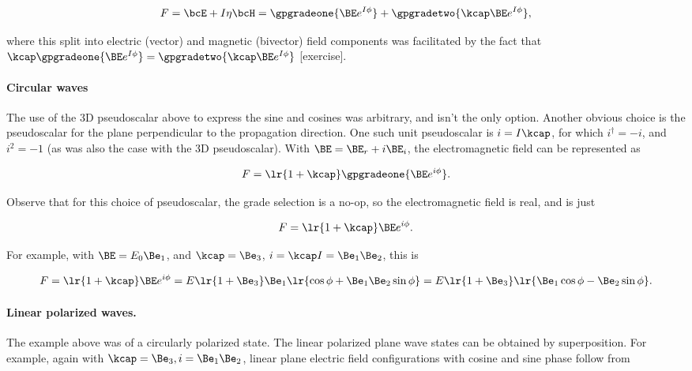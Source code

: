 \begin{equation}\label{eqn:ellipticalWaves:220}
F = \bcE + I \eta \bcH
=
\gpgradeone{ \BE e^{I \phi } } +
\gpgradetwo{ \kcap \BE e^{I \phi } },
\end{equation}

where this split into electric (vector) and magnetic (bivector) field components was facilitated by
the fact that
\( \kcap \gpgradeone{ \BE e^{I \phi } } = \gpgradetwo{ \kcap \BE e^{I \phi } } \) [exercise].

\paragraph{Circular waves}

The use of the 3D pseudoscalar above to express the sine and cosines was arbitrary, and isn't the only option.  Another obvious choice is the pseudoscalar for the plane perpendicular to the propagation direction.  One such unit pseudoscalar is \( i = I \kcap \), for which \( i^\dagger = -i \), and \( i^2 = -1 \) (as was also the case with the 3D pseudoscalar).
With \( \BE = \BE_r + i \BE_i \), the electromagnetic field can be represented as

\begin{dmath}\label{eqn:ellipticalWaves:240}
F
=
\lr{ 1 + \kcap } \gpgradeone{ \BE e^{i \phi } }.
\end{dmath}

Observe that for this choice of pseudoscalar, the grade selection is a no-op, so the electromagnetic field is real, and is just

\begin{dmath}\label{eqn:ellipticalWaves:260}
F
=
\lr{ 1 + \kcap } \BE e^{i \phi }.
\end{dmath}

For example, with \( \BE = E_0 \Be_1 \), and \( \kcap = \Be_3 \), \( i = \kcap I = \Be_1 \Be_2 \), this is

\begin{dmath}\label{eqn:ellipticalWaves:280}
F
=
\lr{ 1 + \kcap } \BE e^{i \phi }
=
E \lr{ 1 + \Be_3 } \Be_1 \lr{ \cos\phi + \Be_1 \Be_2 \sin\phi }
=
E \lr{ 1 + \Be_3 } \lr{ \Be_1 \cos\phi - \Be_2 \sin\phi }.
\end{dmath}

\paragraph{Linear polarized waves.}

The example above was of a circularly polarized state.  The linear polarized plane wave states can be obtained by superposition.  For example, again with \( \kcap = \Be_3, i = \Be_1 \Be_2 \), linear plane electric field configurations with cosine and sine phase follow from

